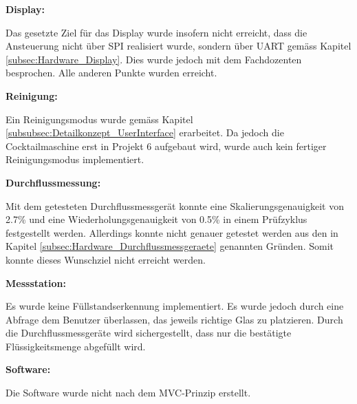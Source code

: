 \textbf{Display:} 

Das gesetzte Ziel für das Display wurde insofern nicht erreicht, dass die Ansteuerung nicht über SPI realisiert wurde, sondern über UART gemäss Kapitel \ref{subsec:Hardware_Display}. Dies wurde jedoch mit dem Fachdozenten besprochen. Alle anderen Punkte wurden erreicht. 

\textbf{Reinigung:}

Ein Reinigungsmodus wurde gemäss Kapitel \ref{subsubsec:Detailkonzept_UserInterface} erarbeitet. Da jedoch die Cocktailmaschine erst in Projekt 6 aufgebaut wird, wurde auch kein fertiger Reinigungsmodus implementiert.

\textbf{Durchflussmessung:}

Mit dem getesteten Durchflussmessgerät konnte eine Skalierungsgenauigkeit von 2.7\% und eine Wiederholungsgenauigkeit von 0.5\% in einem Prüfzyklus festgestellt werden. Allerdings konnte nicht genauer getestet werden aus den in Kapitel \ref{subsec:Hardware_Durchflussmessgeraete} genannten Gründen. Somit konnte dieses Wunschziel nicht erreicht werden.

\textbf{Messstation:}

Es wurde keine Füllstandserkennung implementiert. Es wurde jedoch durch eine Abfrage dem Benutzer überlassen, das jeweils richtige Glas zu platzieren. Durch die Durchflussmessgeräte wird sichergestellt, dass nur die bestätigte Flüssigkeitsmenge abgefüllt wird.  

\textbf{Software:}

Die Software wurde nicht nach dem MVC-Prinzip erstellt.